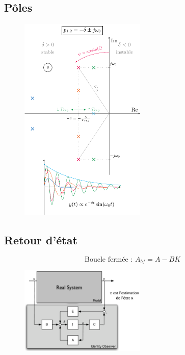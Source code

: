 \documentclass[resume]{subfiles}
\begin{document}
\subsection{Pôles}
\begin{figure}[H]
\centering
\includegraphics[width=6cm,page=1]{drwg_6.pdf}
\end{figure}

\subsection{Retour d'état}
$$\text{Boucle fermée : }A_{bf}=A-BK$$


\begin{figure}[H]
\centering
\includegraphics[width=6cm]{img_14.pdf}
\end{figure}
\end{document}
